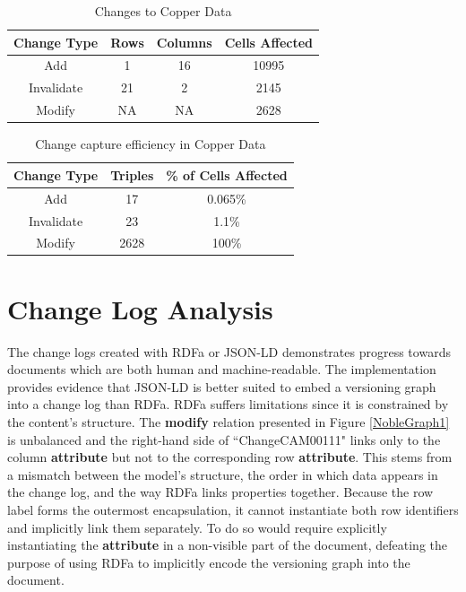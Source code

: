 \begin{table}
	\caption{Changes to Copper Data}
	\label{table:Cu_cells}
	\centering
	\begin{tabular}{|c|c|c|c|}
		\hline
		Change Type&	Rows&	Columns&	Cells Affected\\ \hline
		Add&	1&	16&	10995\\
		Invalidate&	21&	2&	2145\\
		Modify&NA&NA& 2628\\
		\hline
	\end{tabular}
\end{table}

\begin{table}
	\caption{Change capture efficiency in Copper Data}
	\label{table:Cu_change}
	\centering
	\begin{tabular}{|c|c|c|}
		\hline
		Change Type&	Triples&	\% of Cells Affected\\ \hline
		Add&	17&	0.065\%\\
		Invalidate&	23&	1.1\%\\
		Modify&	2628&	100\%\\
		\hline
	\end{tabular}
\end{table}

\section{Change Log Analysis}

The change logs created with RDFa or JSON-LD demonstrates progress towards documents which are both human and machine-readable.
The implementation provides evidence that JSON-LD is better suited to embed a versioning graph into a change log than RDFa.
RDFa suffers limitations since it is constrained by the content's structure.
The \textbf{modify} relation presented in Figure \ref{NobleGraph1} is unbalanced and the right-hand side of ``ChangeCAM00111" links only to the column \textbf{attribute} but not to the corresponding row \textbf{attribute}.
This stems from a mismatch between the model's structure, the order in which data appears in the change log, and the way RDFa links properties together.
Because the row label forms the outermost encapsulation, it cannot instantiate both row identifiers and implicitly link them separately.
To do so would require explicitly instantiating the \textbf{attribute} in a non-visible part of the document, defeating the purpose of using RDFa to implicitly encode the versioning graph into the document.

